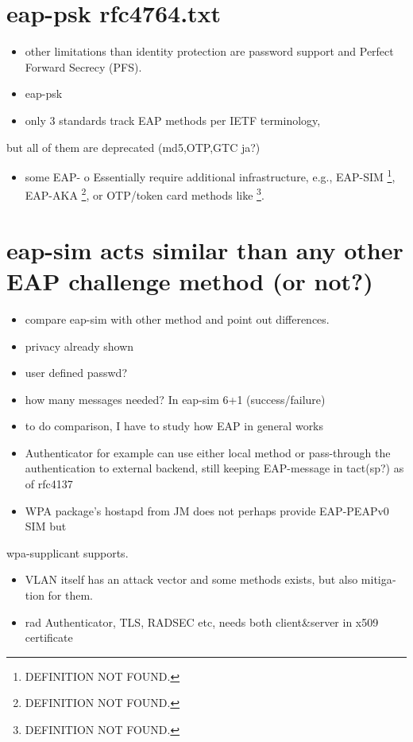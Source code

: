 \documentclass[12pt,a4paper,english]{tutthesis}
\begin{document}
\begin{otherlanguage}{english}
\section{eap-psk rfc4764.txt}
\label{sec-7-3}
\begin{itemize}
\item other limitations than identity protection are password support and Perfect Forward Secrecy (PFS).
\item eap-psk
\item only 3 standards track EAP methods per IETF terminology,
\end{itemize}
but all of them are deprecated (md5,OTP,GTC ja?)
\begin{itemize}
\item some EAP- o  Essentially require additional infrastructure, e.g., EAP-SIM \footnote{DEFINITION NOT FOUND.},
EAP-AKA \footnote{DEFINITION NOT FOUND.}, or OTP/token card methods like \footnote{DEFINITION NOT FOUND.}.
\end{itemize}


\section{eap-sim acts similar than any other EAP challenge method (or not?)}
\label{sec-7-4}
\begin{itemize}
\item compare eap-sim with other method and point out differences.
\item privacy already shown
\item user defined passwd?
\item how many messages needed? In eap-sim 6+1 (success/failure)
\item to do comparison, I have to study how EAP in general works
\item Authenticator for example can use either local method or
pass-through the authentication to external backend, still keeping
EAP-message in tact(sp?) as of  rfc4137
\item WPA package's hostapd from JM does not perhaps provide EAP-PEAPv0 SIM but
\end{itemize}
wpa-supplicant supports.
\begin{itemize}
\item VLAN itself has an attack vector and some methods exists, but also
mitigation for them.
\item rad Authenticator, TLS, RADSEC etc, needs both client\&server in
x509 certificate
\end{itemize}



\end{otherlanguage}
\end{document}
